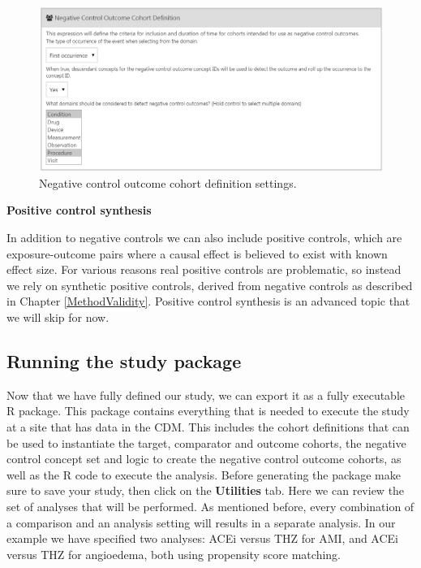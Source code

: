 \documentclass[11pt]{book}
\begin{document}
\begin{figure}

{\centering \includegraphics[width=1\linewidth]{images/PopulationLevelEstimation/ncSettings} 

}

\caption{Negative control outcome cohort definition settings.}\label{fig:ncSettings}
\end{figure}

\textbf{Positive control synthesis}

In addition to negative controls we can also include positive controls,
which are exposure-outcome pairs where a causal effect is believed to
exist with known effect size. For various reasons real positive controls
are problematic, so instead we rely on synthetic positive controls,
derived from negative controls as described in Chapter
\ref{MethodValidity}. Positive control synthesis is an advanced topic
that we will skip for now.

\subsection{Running the study package}\label{running-the-study-package}

Now that we have fully defined our study, we can export it as a fully
executable R package. This package contains everything that is needed to
execute the study at a site that has data in the CDM. This includes the
cohort definitions that can be used to instantiate the target,
comparator and outcome cohorts, the negative control concept set and
logic to create the negative control outcome cohorts, as well as the R
code to execute the analysis. Before generating the package make sure to
save your study, then click on the \textbf{Utilities} tab. Here we can
review the set of analyses that will be performed. As mentioned before,
every combination of a comparison and an analysis setting will results
in a separate analysis. In our example we have specified two analyses:
ACEi versus THZ for AMI, and ACEi versus THZ for angioedema, both using
propensity score matching.
\end{document}
